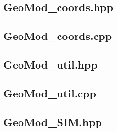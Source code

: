 \documentclass[a4paper, 12pt]{article}
\begin{document}
\subsection{GeoMod\_coords.hpp} \label{subsec:coords_hpp}

\subsection{GeoMod\_coords.cpp} \label{subsec:coords_cpp}


\subsection{GeoMod\_util.hpp} \label{subsec:util_hpp}

\subsection{GeoMod\_util.cpp} \label{subsec:util_cpp}


\subsection{GeoMod\_SIM.hpp} \label{subsec:SIM_hpp}

\end{document}
